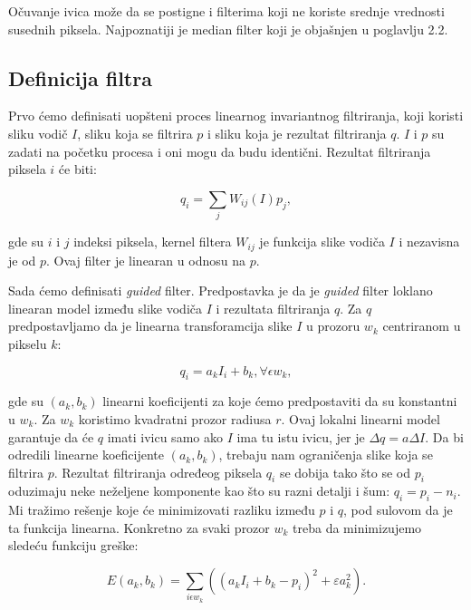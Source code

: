 \documentclass[a4paper,12pt,titlepage]{article}
\begin{document}
Očuvanje ivica može da se postigne i filterima koji ne koriste srednje vrednosti susednih piksela. Najpoznatiji je median filter koji je objašnjen u poglavlju 2.2.           

\subsection{Definicija filtra}%

Prvo ćemo definisati uopšteni proces linearnog invariantnog filtriranja, koji koristi sliku vodič $I$, sliku koja se filtrira $p$ i sliku koja je rezultat filtriranja $q$. $I$ i $p$ su zadati na početku procesa i oni mogu da budu identični. Rezultat filtriranja piksela $i$ će biti: 

\begin{equation}\label{eq:gf1}
	q_i = \sum_{j} W_{ij}(I)p_j,
\end{equation}

gde su $i$ i $j$ indeksi piksela, kernel filtera $W_{ij}$ je funkcija slike vodiča $I$ i nezavisna je od $p$. Ovaj filter je linearan u odnosu na $p$. 

Sada ćemo definisati \emph{guided} filter. Predpostavka je da je \emph{guided} filter loklano linearan model između slike vodiča $I$ i rezultata filtriranja $q$. Za $q$ predpostavljamo da je linearna transforamcija slike $I$ u prozoru $w_k$ centriranom u pikselu $k$:

\begin{equation}\label{eq:gf2}
	q_i = a_kI_i + b_k, \forall \epsilon w_k,
\end{equation}

gde su $(a_k, b_k)$ linearni koeficijenti za koje ćemo predpostaviti da su konstantni u $w_k$. Za $w_k$ koristimo kvadratni prozor radiusa $r$. Ovaj lokalni linearni model garantuje da će $q$ imati ivicu samo ako $I$ ima tu istu ivicu, jer je $\Delta q = a\Delta I$. Da bi odredili linearne koeficijente $(a_k, b_k)$, trebaju nam ograničenja slike koja se filtrira $p$. Rezultat filtriranja određeog piksela $q_i$ se dobija tako što se od $p_i$ oduzimaju neke neželjene komponente kao što su razni detalji i šum: $q_i = p_i - n_i$. Mi tražimo rešenje koje će minimizovati razliku između $p$ i $q$, pod sulovom da je ta funkcija linearna. Konkretno za svaki prozor $w_k$ treba da minimizujemo sledeću funkciju greške:

\begin{equation}\label{eq:gf3}
	E(a_k, b_k) = \sum_{i \epsilon w_k} ((a_kI_i + b_k - p_i)^2 + \varepsilon a_k^2).
\end{equation}
\end{document}
